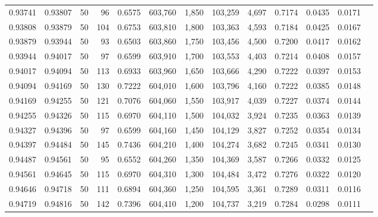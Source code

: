 \begin{tabular}{rrrrrrrrrrrrr}
0.93741 & 0.93807 &    50 &  96 &                                     0.6575 & 603,760 &   1,850 & 103,259 &   4,697 & 0.7174 & 0.0435 & 0.0171 \\
0.93808 & 0.93879 &    50 & 104 &                                     0.6753 & 603,810 &   1,800 & 103,363 &   4,593 & 0.7184 & 0.0425 & 0.0167 \\
0.93879 & 0.93944 &    50 &  93 &                                     0.6503 & 603,860 &   1,750 & 103,456 &   4,500 & 0.7200 & 0.0417 & 0.0162 \\
0.93944 & 0.94017 &    50 &  97 &                                     0.6599 & 603,910 &   1,700 & 103,553 &   4,403 & 0.7214 & 0.0408 & 0.0157 \\
0.94017 & 0.94094 &    50 & 113 &                                     0.6933 & 603,960 &   1,650 & 103,666 &   4,290 & 0.7222 & 0.0397 & 0.0153 \\
0.94094 & 0.94169 &    50 & 130 &                                     0.7222 & 604,010 &   1,600 & 103,796 &   4,160 & 0.7222 & 0.0385 & 0.0148 \\
0.94169 & 0.94255 &    50 & 121 &                                     0.7076 & 604,060 &   1,550 & 103,917 &   4,039 & 0.7227 & 0.0374 & 0.0144 \\
0.94255 & 0.94326 &    50 & 115 &                                     0.6970 & 604,110 &   1,500 & 104,032 &   3,924 & 0.7235 & 0.0363 & 0.0139 \\
0.94327 & 0.94396 &    50 &  97 &                                     0.6599 & 604,160 &   1,450 & 104,129 &   3,827 & 0.7252 & 0.0354 & 0.0134 \\
0.94397 & 0.94484 &    50 & 145 &                                     0.7436 & 604,210 &   1,400 & 104,274 &   3,682 & 0.7245 & 0.0341 & 0.0130 \\
0.94487 & 0.94561 &    50 &  95 &                                     0.6552 & 604,260 &   1,350 & 104,369 &   3,587 & 0.7266 & 0.0332 & 0.0125 \\
0.94561 & 0.94645 &    50 & 115 &                                     0.6970 & 604,310 &   1,300 & 104,484 &   3,472 & 0.7276 & 0.0322 & 0.0120 \\
0.94646 & 0.94718 &    50 & 111 &                                     0.6894 & 604,360 &   1,250 & 104,595 &   3,361 & 0.7289 & 0.0311 & 0.0116 \\
0.94719 & 0.94816 &    50 & 142 &                                     0.7396 & 604,410 &   1,200 & 104,737 &   3,219 & 0.7284 & 0.0298 & 0.0111 \\

\end{tabular}
